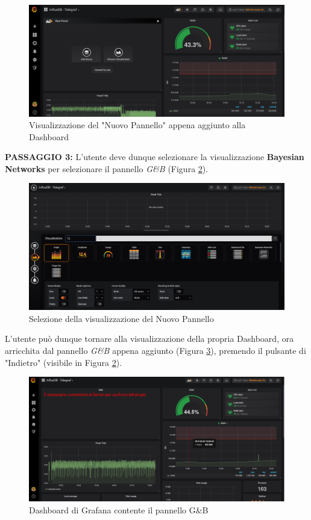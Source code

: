 \begin{figure}[H]
	\begin{center}
		\includegraphics[scale=0.31]{./images/NewPanel.png}
		 \caption{Visualizzazione del "Nuovo Pannello" appena aggiunto alla Dashboard}	
		 \label{NewPanel}
	\end{center}
\end{figure}

\textbf{PASSAGGIO 3:} L'utente deve dunque selezionare la visualizzazione \textbf{Bayesian Networks} per selezionare il pannello \textit{G\&B} (Figura \ref{AddPanelImg}).

\begin{figure}[H]
	\begin{center}
		\includegraphics[scale=0.37]{./images/AddPanel.png}
		 \caption{Selezione della visualizzazione del Nuovo Pannello}	
		 \label{AddPanelImg}
	\end{center}
\end{figure}


L'utente può dunque tornare alla visualizzazione della propria Dashboard, ora arricchita dal pannello \textit{G\&B} appena aggiunto (Figura \ref{DashboardPanel}), premendo il pulsante di "Indietro" (visibile in Figura \ref{AddPanelImg}).

\begin{figure}[H]
	\begin{center}
		\includegraphics[scale=0.37]{./images/DashboardPanel.png}
		 \caption{Dashboard di Grafana contente il pannello G\&B}	
		 \label{DashboardPanel}
	\end{center}
\end{figure}
